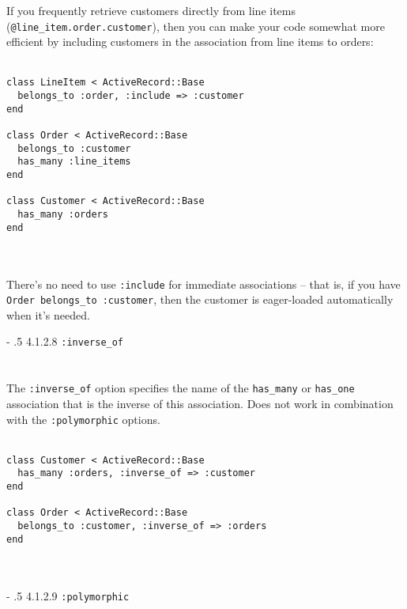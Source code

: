 \documentclass[10pt]{book}
\makeatletter
\renewcommand\paragraph{%
   \@startsection{paragraph}{4}{0mm}%
      {-\baselineskip}%
      {.5\baselineskip}%
      {\normalfont\scriptsize\bfseries}}
\makeatother
\begin{document}
If you frequently retrieve customers directly from line items (\texttt{@line\_item.order.customer}), then you can make your code somewhat more efficient by including customers in the association from line items to orders:
\\ \\
\begin{minipage}{\textwidth}{\scriptsize
\begin{verbatim}
class LineItem < ActiveRecord::Base
  belongs_to :order, :include => :customer
end
 
class Order < ActiveRecord::Base
  belongs_to :customer
  has_many :line_items
end
 
class Customer < ActiveRecord::Base
  has_many :orders
end

\end{verbatim}}
\end{minipage}
\\ \\

There’s no need to use \texttt{:include} for immediate associations – that is, if you have \texttt{Order belongs\_to :customer}, then the customer is eager-loaded automatically when it’s needed.

\paragraph{4.1.2.8 \texttt{:inverse\_of}}\\ \\\\

The \texttt{:inverse\_of} option specifies the name of the \texttt{has\_many} or \texttt{has\_one} association that is the inverse of this association. Does not work in combination with the \texttt{:polymorphic} options.
\\ \\
\begin{minipage}{\textwidth}{\scriptsize
\begin{verbatim}
class Customer < ActiveRecord::Base
  has_many :orders, :inverse_of => :customer
end
 
class Order < ActiveRecord::Base
  belongs_to :customer, :inverse_of => :orders
end
\end{verbatim}}
\end{minipage}
\\ \\

\paragraph{4.1.2.9 \texttt{:polymorphic}}\\ \\\\
\end{document}
